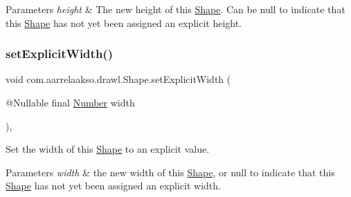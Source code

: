 \begin{DoxyParams}{Parameters}
{\em height} & The new height of this \hyperlink{classcom_1_1aarrelaakso_1_1drawl_1_1_shape}{Shape}. Can be {\ttfamily null} to indicate that this \hyperlink{classcom_1_1aarrelaakso_1_1drawl_1_1_shape}{Shape} has not yet been assigned an explicit height. \\
\hline
\end{DoxyParams}
\mbox{\label{classcom_1_1aarrelaakso_1_1drawl_1_1_shape_a386685477bfc007aab782565f140265d}} 
\subsubsection{\texorpdfstring{set\+Explicit\+Width()}{setExplicitWidth()}}
{\footnotesize\ttfamily void com.\+aarrelaakso.\+drawl.\+Shape.\+set\+Explicit\+Width (\begin{DoxyParamCaption}\item[{@Nullable final \hyperlink{interfacecom_1_1aarrelaakso_1_1drawl_1_1_number}{Number}}]{width }\end{DoxyParamCaption})\hspace{0.3cm}{\ttfamily [protected]}, {\ttfamily [inherited]}}



Set the width of this \hyperlink{classcom_1_1aarrelaakso_1_1drawl_1_1_shape}{Shape} to an explicit value. 


\begin{DoxyParams}{Parameters}
{\em width} & the new width of this \hyperlink{classcom_1_1aarrelaakso_1_1drawl_1_1_shape}{Shape}, or {\ttfamily null} to indicate that this \hyperlink{classcom_1_1aarrelaakso_1_1drawl_1_1_shape}{Shape} has not yet been assigned an explicit width. \\
\hline
\end{DoxyParams}
\mbox{\label{classcom_1_1aarrelaakso_1_1drawl_1_1_shape_a28c766b414be0cd8767093f9be557dbd}} 
